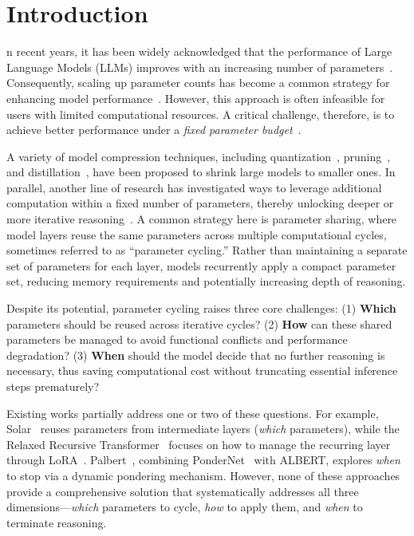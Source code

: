 \section{Introduction}
n recent years, it has been widely acknowledged that the performance of Large Language Models (LLMs) improves with an increasing number of parameters~\cite{rae2021scaling,rosenfeld2019constructive}. Consequently, scaling up parameter counts has become a common strategy for enhancing model performance~\cite{leviathan2023fast,xu2024fwdllm,pope2023efficiently}. However, this approach is often infeasible for users with limited computational resources. A critical challenge, therefore, is to achieve better performance under a \emph{fixed parameter budget}~\cite{zhou2024survey}.

A variety of model compression techniques, including quantization~\cite{lin2024awq,liu2023llm}, pruning~\cite{ma2023llm,sun2023simple}, and distillation~\cite{latif2023knowledge,shum2024first}, have been proposed to shrink large models to smaller ones. In parallel, another line of research has investigated ways to leverage additional computation within a fixed number of parameters, thereby unlocking deeper or more iterative reasoning~\cite{dehghani2018universal, lan2019albert}. A common strategy here is {parameter sharing}, where model layers reuse the same parameters across multiple computational cycles, sometimes referred to as “parameter cycling.” Rather than maintaining a separate set of parameters for each layer, models recurrently apply a compact parameter set, reducing memory requirements and potentially increasing depth of reasoning.

Despite its potential, parameter cycling raises three core challenges: (1) \textbf{Which} parameters should be reused across iterative cycles?
 (2) \textbf{How} can these shared parameters be managed to avoid functional conflicts and performance degradation?
(3) \textbf{When} should the model decide that no further reasoning is necessary, thus saving computational cost without truncating essential inference steps prematurely? 


Existing works partially address one or two of these questions. For example, Solar~\cite{kim2023solar} reuses parameters from intermediate layers (\emph{which} parameters), while the Relaxed Recursive Transformer~\cite{bae2024relaxed} focuses on how to manage the recurring layer through LoRA~\cite{hu2021lora}. Palbert~\cite{balagansky2022palbert}, combining PonderNet~\cite{banino2021pondernet} with ALBERT, explores \emph{when} to stop via a dynamic pondering mechanism. However, none of these approaches provide a comprehensive solution that systematically addresses all three dimensions—\emph{which} parameters to cycle, \emph{how} to apply them, and \emph{when} to terminate reasoning.

